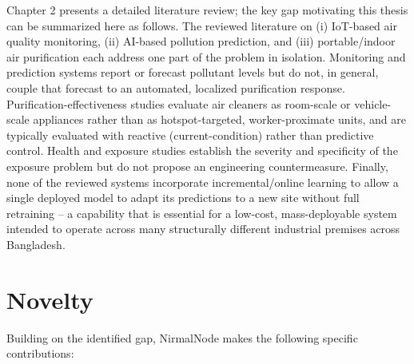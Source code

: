 Chapter 2 presents a detailed literature review; the key gap motivating this thesis can be summarized here as follows. The reviewed literature on (i) IoT-based air quality monitoring, (ii) AI-based pollution prediction, and (iii) portable/indoor air purification each address one part of the problem in isolation. Monitoring and prediction systems \citep{alam2025iot,zhang2020realtime,kataria2022aiiot,mani2021aipowered,islam2025dhaka} report or forecast pollutant levels but do not, in general, couple that forecast to an automated, localized purification response. Purification-effectiveness studies \citep{dubey2021assessing,lu2023realworld,cox2018effectiveness,chen2022efficacy,lee2022effect,chen2025fine,szczotko2022review} evaluate air cleaners as room-scale or vehicle-scale appliances rather than as hotspot-targeted, worker-proximate units, and are typically evaluated with reactive (current-condition) rather than predictive control. Health and exposure studies \citep{nasri2023pm25,sekhavati2023particulate,alhadhrami2024pm25mental,rahman2025perceived} establish the severity and specificity of the exposure problem but do not propose an engineering countermeasure. Finally, none of the reviewed systems incorporate incremental/online learning to allow a single deployed model to adapt its predictions to a new site without full retraining -- a capability that is essential for a low-cost, mass-deployable system intended to operate across many structurally different industrial premises across Bangladesh.

\section{Novelty}
\label{sec:novelty}

Building on the identified gap, NirmalNode makes the following specific contributions:

